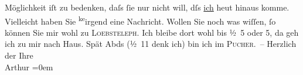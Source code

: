 \begin{ledgroupsized}[t]{13cm}
               Möglichkeit iſt zu bedenken, daſs ſie nur nicht will, dſs \uline{ich} heut hinaus komme. {\pb}Vielleicht haben Sie \substVorne{}\textsuperscript{ke}\substDazwischen{}ir\substHinten{}gend eine Nachricht.\pend
           \pstart
           Wollen Sie noch was wiſſen, ſo können Sie mir wohl zu \textsc{Loebs}\textsc{teleph}. Ich bleibe dort wohl bis ½ 5 oder
                  5, da{\geminationn} geh ich zu mir nach Haus. Spät
               Abds (½ 11 denk ich) {\pb}bin ich im \textsc{Pucher}. –\pend
           \pstart
           Herzlich der Ihre{\\[\baselineskip]}\spacefill\mbox{Arthur}\pend
           \leftskip=0em{}
         
         \endnumbering{}\end{ledgroupsized}  \newcommand{\dateiname}{L00645}\newcommand{\titel}{Arthur Schnitzler an Hugo von Hofmannsthal, [9. 2. 1897?]}\newcommand{\editorInnen}{Martin Anton Müller und Gerd-Hermann Susen}
      